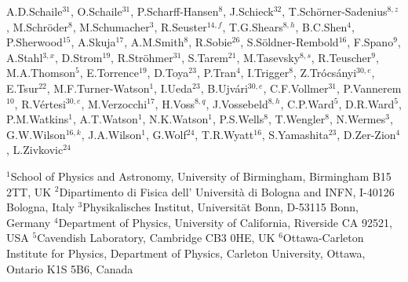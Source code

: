 \documentclass[12pt,a4paper,twoside]{article}
\begin{document}
\begin{center}
{A.D.\thinspace Schaile$^{ 31}$,
O.\thinspace Schaile$^{ 31}$,
P.\thinspace Scharff-Hansen$^{  8}$,
J.\thinspace Schieck$^{ 32}$,
T.\thinspace Sch\"orner-Sadenius$^{  8, z}$,
M.\thinspace Schr\"oder$^{  8}$,
M.\thinspace Schumacher$^{  3}$,
R.\thinspace Seuster$^{ 14,  f}$,
T.G.\thinspace Shears$^{  8,  h}$,
B.C.\thinspace Shen$^{  4}$,
P.\thinspace Sherwood$^{ 15}$,
A.\thinspace Skuja$^{ 17}$,
A.M.\thinspace Smith$^{  8}$,
R.\thinspace Sobie$^{ 26}$,
S.\thinspace S\"oldner-Rembold$^{ 16}$,
F.\thinspace Spano$^{  9}$,
A.\thinspace Stahl$^{  3,  x}$,
D.\thinspace Strom$^{ 19}$,
R.\thinspace Str\"ohmer$^{ 31}$,
S.\thinspace Tarem$^{ 21}$,
M.\thinspace Tasevsky$^{  8,  s}$,
R.\thinspace Teuscher$^{  9}$,
M.A.\thinspace Thomson$^{  5}$,
E.\thinspace Torrence$^{ 19}$,
D.\thinspace Toya$^{ 23}$,
P.\thinspace Tran$^{  4}$,
I.\thinspace Trigger$^{  8}$,
Z.\thinspace Tr\'ocs\'anyi$^{ 30,  e}$,
E.\thinspace Tsur$^{ 22}$,
M.F.\thinspace Turner-Watson$^{  1}$,
I.\thinspace Ueda$^{ 23}$,
B.\thinspace Ujv\'ari$^{ 30,  e}$,
C.F.\thinspace Vollmer$^{ 31}$,
P.\thinspace Vannerem$^{ 10}$,
R.\thinspace V\'ertesi$^{ 30, e}$,
M.\thinspace Verzocchi$^{ 17}$,
H.\thinspace Voss$^{  8,  q}$,
J.\thinspace Vossebeld$^{  8,   h}$,
C.P.\thinspace Ward$^{  5}$,
D.R.\thinspace Ward$^{  5}$,
P.M.\thinspace Watkins$^{  1}$,
A.T.\thinspace Watson$^{  1}$,
N.K.\thinspace Watson$^{  1}$,
P.S.\thinspace Wells$^{  8}$,
T.\thinspace Wengler$^{  8}$,
N.\thinspace Wermes$^{  3}$,
G.W.\thinspace Wilson$^{ 16,  k}$,
J.A.\thinspace Wilson$^{  1}$,
G.\thinspace Wolf$^{ 24}$,
T.R.\thinspace Wyatt$^{ 16}$,
S.\thinspace Yamashita$^{ 23}$,
D.\thinspace Zer-Zion$^{  4}$,
L.\thinspace Zivkovic$^{ 24}$
}\end{center}\bigskip
\bigskip
$^{  1}$School of Physics and Astronomy, University of Birmingham,
Birmingham B15 2TT, UK
\newline
$^{  2}$Dipartimento di Fisica dell' Universit\`a di Bologna and INFN,
I-40126 Bologna, Italy
\newline
$^{  3}$Physikalisches Institut, Universit\"at Bonn,
D-53115 Bonn, Germany
\newline
$^{  4}$Department of Physics, University of California,
Riverside CA 92521, USA
\newline
$^{  5}$Cavendish Laboratory, Cambridge CB3 0HE, UK
\newline
$^{  6}$Ottawa-Carleton Institute for Physics,
Department of Physics, Carleton University,
Ottawa, Ontario K1S 5B6, Canada
\newline
\end{document}
